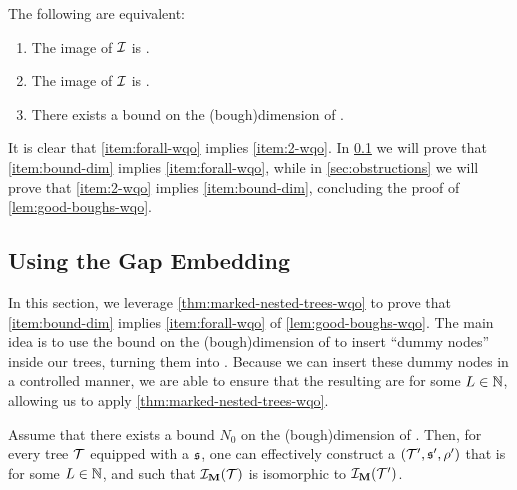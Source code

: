\begin{lemma}
  \label{lem:good-boughs-wqo}
  The following are equivalent:
  \begin{enumerate}
    \item \label{item:2-wqo} The image of $\mathcal{I}$ is .
    \item \label{item:forall-wqo} The image of $\mathcal{I}$ is .
    \item \label{item:bound-dim} There exists a bound on the \kl(bough){dimension} of .
  \end{enumerate}
\end{lemma}

It is clear that \cref{item:forall-wqo} implies \cref{item:2-wqo}. In 
\cref{sec:gap-embedding} we will prove that \cref{item:bound-dim} implies
\cref{item:forall-wqo}, while in \cref{sec:obstructions} we will prove that
\cref{item:2-wqo} implies \cref{item:bound-dim}, concluding the proof of
\cref{lem:good-boughs-wqo}.

\subsection{Using the Gap Embedding}
\label{sec:gap-embedding}

In this section, we leverage \cref{thm:marked-nested-trees-wqo} to prove
that \cref{item:bound-dim} implies \cref{item:forall-wqo} of
\cref{lem:good-boughs-wqo}. The main idea is to use the bound on the
\kl(bough){dimension} of  to insert ``dummy nodes'' inside our
trees, turning them into . Because we can insert these
dummy nodes in a controlled manner, we are able to ensure that the
resulting  are  for some $L \in \mathbb{N}$,
allowing us to apply \cref{thm:marked-nested-trees-wqo}. 



\begin{lemma}
    \label{lem:important-nodes}
    Assume that there exists a bound $N_0$ on the \kl(bough){dimension} of . Then, for every tree $\t$ equipped with a  $\mathfrak{s}$, 
    one can effectively construct a  $(\t', \spt', \marking')$ 
    that is  for some $L \in \mathbb{N}$, and such that 
    $\someInterp_{\marked}(\t)$ is isomorphic to $\someInterp_{\marked}(\t')$.
\end{lemma}


